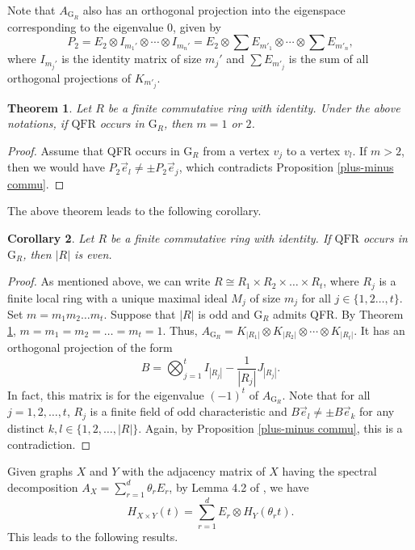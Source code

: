 \documentclass[12pt]{amsart}
\numberwithin{equation}{section}
\newtheorem{thm}{Theorem}[section]
\newtheorem{lem}[thm]{Lemma}
\newtheorem{cor}[thm]{Corollary}
\theoremstyle{definition}
\theoremstyle{definition} \numberwithin{equation}{section}
\newcommand{\G}{\mathrm{G}}
\newcommand{\QFR}{\mathrm{QFR}}
\begin{document}
Note that $A_{\G_R}$ also has an orthogonal projection into the eigenspace corresponding to the eigenvalue $0$, given by
\[
P_2 = E_2 \otimes I_{m_1'} \otimes \cdots \otimes I_{m_n'} = E_2 \otimes \sum E_{m'_1} \otimes \cdots \otimes \sum E_{m'_n},
\]
where $I_{m_j'}$ is the identity matrix of size $m_j'$ and $\sum E_{m'_j}$ is the sum of all orthogonal projections of $K_{m'_j}$.

\begin{thm}\label{m=1,2}
    Let $R$ be a finite commutative ring with identity. Under the above notations, if $\QFR$ occurs in $\G_R$, then $m = 1$ or $2$. 
\end{thm}
\begin{proof}
  Assume that QFR occurs in $\G_R$ from a vertex $v_j$ to a vertex $v_l$. If $m > 2$, then we would have $P_2 \vec{e}_l \neq \pm P_2 \vec{e}_j$, which contradicts Proposition \ref{plus-minus commu}.
\end{proof}

The above theorem leads to the following corollary. 

\begin{cor}\label{evenonly}
    Let $R$ be a finite commutative ring with identity. If $\QFR$ occurs in $\G_R$, then $|R|$ is even. 
\end{cor}
\begin{proof}
    As mentioned above, we can write $R \cong R_1 \times R_2 \times \ldots \times R_t$, where $R_j$ is a finite local ring with a unique maximal ideal $M_j$ of size $m_j$ for all $j \in \{1,2\ldots,t\}$. Set $m = m_1 m_2 \ldots m_t$. Suppose that $|R|$ is odd and $\G_R$ admits QFR. By Theorem \ref{m=1,2}, $m = m_1 = m_2 = \dots = m_t = 1$. Thus, $A_{\G_R} = K_{|R_1|} \otimes K_{|R_2|} \otimes \cdots \otimes K_{|R_t|}$. It has an orthogonal projection of the form 
    \[
    B = \bigotimes_{j = 1}^t I_{|R_j|} - \frac{1}{|R_j|} J_{|R_j|}.
    \]
    In fact, this matrix is for the eigenvalue $(-1)^t$ of $A_{\G_R}$. Note that for all $j = 1, 2, \ldots, t$, $R_j$ is a finite field of odd characteristic and $B \vec{e}_l \neq \pm B \vec{e}_k$ for any distinct $k, l \in \{1, 2, \ldots, |R| \}$. Again, by Proposition \ref{plus-minus commu}, this is a contradiction.
\end{proof}

\smallskip

Given graphs $X$ and $Y$ with the adjacency matrix of $X$ having the spectral decomposition $A_X = \sum_{r = 1}^d \theta_r E_r$, by Lemma 4.2 of \cite{CG15}, we have 
\[
H_{X \times Y}(t) = \sum_{r = 1}^d E_r \otimes H_Y(\theta_r t). 
\]
This leads to the following results.
\end{document}
